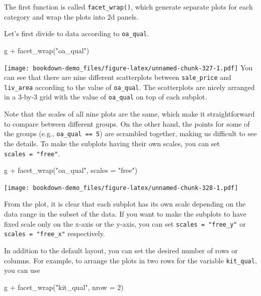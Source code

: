 \documentclass[
]{book}
\newenvironment{Shaded}{\begin{snugshade}}{\end{snugshade}}
\newcommand{\AttributeTok}[1]{\textcolor[rgb]{0.77,0.63,0.00}{#1}}
\newcommand{\DecValTok}[1]{\textcolor[rgb]{0.00,0.00,0.81}{#1}}
\newcommand{\FunctionTok}[1]{\textcolor[rgb]{0.00,0.00,0.00}{#1}}
\newcommand{\NormalTok}[1]{#1}
\newcommand{\SpecialCharTok}[1]{\textcolor[rgb]{0.00,0.00,0.00}{#1}}
\newcommand{\StringTok}[1]{\textcolor[rgb]{0.31,0.60,0.02}{#1}}
\begin{document}
The first function is called \texttt{facet\_wrap()}, which generate separate plots for each category and wrap the plots into 2d panels.

Let's first divide to data according to \texttt{oa\_qual}.

\begin{Shaded}
\begin{Highlighting}[]
\NormalTok{g }\SpecialCharTok{+} \FunctionTok{facet\_wrap}\NormalTok{(}\StringTok{"oa\_qual"}\NormalTok{)}
\end{Highlighting}
\end{Shaded}

\texttt{[image: bookdown-demo\_files/figure-latex/unnamed-chunk-327-1.pdf]}
You can see that there are nine different scatterplots between \texttt{sale\_price} and \texttt{liv\_area} according to the value of \texttt{oa\_qual}. The scatterplots are nicely arranged in a 3-by-3 grid with the value of \texttt{oa\_qual} on top of each subplot.

Note that the scales of all nine plots are the same, which make it straightforward to compare between different groups. On the other hand, the points for some of the groups (e.g., \texttt{oa\_qual\ ==\ 5}) are scrambled together, making us difficult to see the details. To make the subplots having their own scales, you can set \texttt{scales\ =\ "free"}.

\begin{Shaded}
\begin{Highlighting}[]
\NormalTok{g }\SpecialCharTok{+} \FunctionTok{facet\_wrap}\NormalTok{(}\StringTok{"oa\_qual"}\NormalTok{, }\AttributeTok{scales =} \StringTok{"free"}\NormalTok{)}
\end{Highlighting}
\end{Shaded}

\texttt{[image: bookdown-demo\_files/figure-latex/unnamed-chunk-328-1.pdf]}

From the plot, it is clear that each subplot has its own scale depending on the data range in the subset of the data. If you want to make the subplots to have fixed scale only on the x-axis or the y-axis, you can set \texttt{scales\ =\ "free\_y"} or \texttt{scales\ =\ "free\_x"} respectively.

In addition to the default layout, you can set the desired number of rows or columns. For example, to arrange the plots in two rows for the variable \texttt{kit\_qual}, you can use

\begin{Shaded}
\begin{Highlighting}[]
\NormalTok{g }\SpecialCharTok{+} \FunctionTok{facet\_wrap}\NormalTok{(}\StringTok{"kit\_qual"}\NormalTok{, }\AttributeTok{nrow =} \DecValTok{2}\NormalTok{)}
\end{Highlighting}
\end{Shaded}
\end{document}
